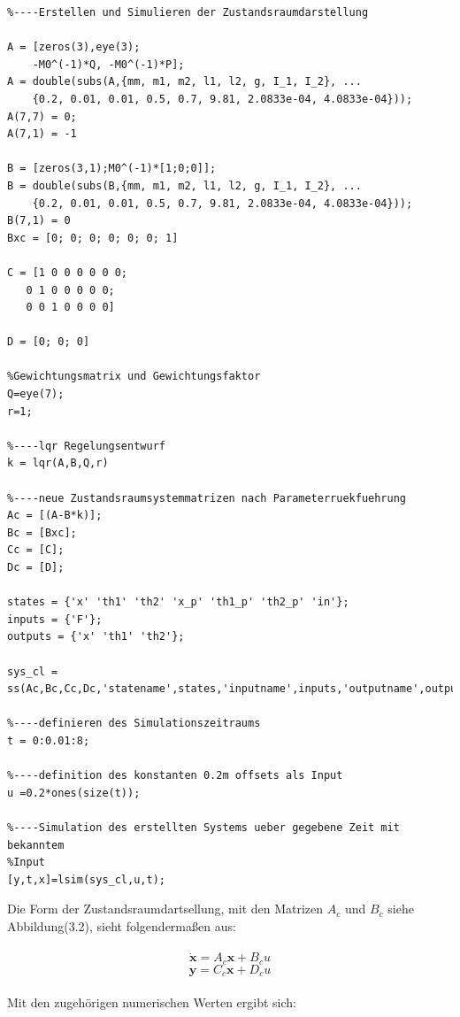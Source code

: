 \documentclass[a4paper, 10pt]{report}
\begin{document}
\begin{lstlisting}
%----Erstellen und Simulieren der Zustandsraumdarstellung

A = [zeros(3),eye(3);
    -M0^(-1)*Q, -M0^(-1)*P];
A = double(subs(A,{mm, m1, m2, l1, l2, g, I_1, I_2}, ...
    {0.2, 0.01, 0.01, 0.5, 0.7, 9.81, 2.0833e-04, 4.0833e-04}));
A(7,7) = 0;
A(7,1) = -1

B = [zeros(3,1);M0^(-1)*[1;0;0]];
B = double(subs(B,{mm, m1, m2, l1, l2, g, I_1, I_2}, ...
    {0.2, 0.01, 0.01, 0.5, 0.7, 9.81, 2.0833e-04, 4.0833e-04}));
B(7,1) = 0
Bxc = [0; 0; 0; 0; 0; 0; 1]

C = [1 0 0 0 0 0 0;
   0 1 0 0 0 0 0;
   0 0 1 0 0 0 0]

D = [0; 0; 0]

%Gewichtungsmatrix und Gewichtungsfaktor
Q=eye(7);
r=1;

%----lqr Regelungsentwurf
k = lqr(A,B,Q,r)

%----neue Zustandsraumsystemmatrizen nach Parameterruekfuehrung
Ac = [(A-B*k)];
Bc = [Bxc];
Cc = [C];
Dc = [D];

states = {'x' 'th1' 'th2' 'x_p' 'th1_p' 'th2_p' 'in'};
inputs = {'F'};
outputs = {'x' 'th1' 'th2'};

sys_cl = ss(Ac,Bc,Cc,Dc,'statename',states,'inputname',inputs,'outputname',outputs);

%----definieren des Simulationszeitraums
t = 0:0.01:8;

%----definition des konstanten 0.2m offsets als Input
u =0.2*ones(size(t));

%----Simulation des erstellten Systems ueber gegebene Zeit mit bekanntem
%Input
[y,t,x]=lsim(sys_cl,u,t);
\end{lstlisting}
Die Form der Zustandsraumdartsellung, mit den Matrizen $A_{c}$ und $B_{c}$ siehe Abbildung(3.2), sieht folgendermaßen aus:\\\\
\begin{equation}
\label{eqn:Zustandraumdarstellung}
\mathbf{\dot{x}}=A_{c} \mathbf{x}+B_{c} u 
\end{equation}
\begin{equation}
\mathbf{y}=C_{c} \mathbf{x}+D_{c} u
\end{equation}
\\
Mit den zugehörigen numerischen Werten ergibt sich:
\\ \\
\end{document}
